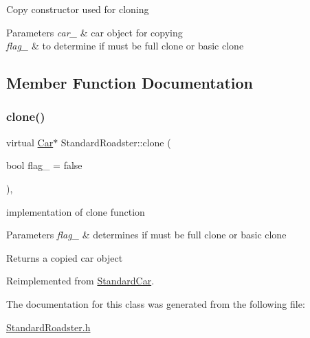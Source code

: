 Copy constructor used for cloning 
\begin{DoxyParams}{Parameters}
{\em car\+\_\+} & car object for copying \\
\hline
{\em flag\+\_\+} & to determine if must be full clone or basic clone \\
\hline
\end{DoxyParams}


\subsection{Member Function Documentation}
\mbox{\label{class_standard_roadster_aa4aa69bc59c2095faae2fbc7de12798d}} 
\subsubsection{\texorpdfstring{clone()}{clone()}}
{\footnotesize\ttfamily virtual \mbox{\hyperlink{class_car}{Car}}$\ast$ Standard\+Roadster\+::clone (\begin{DoxyParamCaption}\item[{bool}]{flag\+\_\+ = {\ttfamily false} }\end{DoxyParamCaption})\hspace{0.3cm}{\ttfamily [inline]}, {\ttfamily [virtual]}}

implementation of clone function 
\begin{DoxyParams}{Parameters}
{\em flag\+\_\+} & determines if must be full clone or basic clone \\
\hline
\end{DoxyParams}
\begin{DoxyReturn}{Returns}
a copied car object 
\end{DoxyReturn}


Reimplemented from \mbox{\hyperlink{class_standard_car_a2fd5dd06bebd68db247bab73bd2176be}{Standard\+Car}}.



The documentation for this class was generated from the following file\+:\begin{DoxyCompactItemize}
\item 
\mbox{\hyperlink{_standard_roadster_8h}{Standard\+Roadster.\+h}}\end{DoxyCompactItemize}
